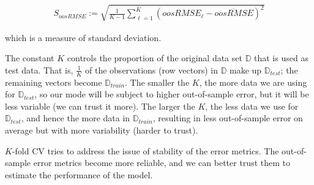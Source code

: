 \documentclass[12pt]{article}
\begin{document}
\begin{enumerate}
\begin{align*}
	S_{oosRMSE}:=\sqrt{\frac{1}{K-1}\sum_{\ell=1}^{K}(oosRMSE_\ell-\overline{oosRMSE})^2}
\end{align*}

which is a measure of standard deviation.


\end{enumerate}



\begin{enumerate}


The constant $K$ controls the proportion of the original data set $\mathbb{D}$ that is used
as test data. That is, $\frac{1}{K}$ of the observations (row vectors) in $\mathbb{D}$ make up
$\mathbb{D}_{test}$; the remaining vectors become $\mathbb{D}_{train}$. The smaller the
$K$, the more data we are using for $\mathbb{D}_{test}$, so our mode will be subject
to higher out-of-sample error, but it will be less variable (we can trust it more). The larger the $K$,
the less data we use for $\mathbb{D}_{test}$, and hence the more data in $\mathbb{D}_{train}$,
resulting in less out-of-sample error on average but with more variability (harder to trust).


$K$-fold CV tries to address the issue of stability of the error metrics.
The out-of-sample error metrics become more reliable, and we can better trust
them to estimate the performance of the model.



\end{enumerate}
\end{document}
